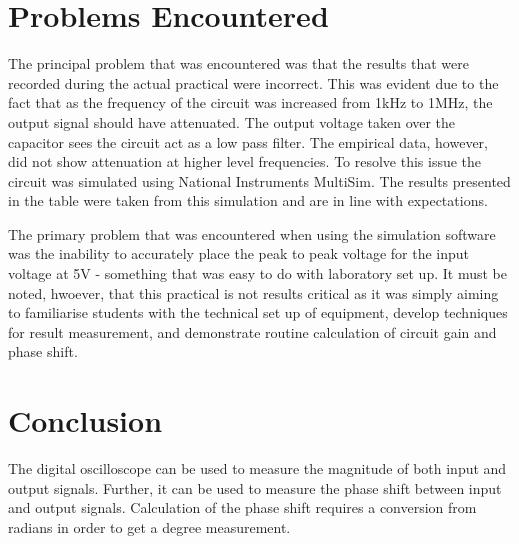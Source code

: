 \documentclass{article}
\begin{document}

\section{Problems Encountered}


The principal problem that was encountered was that the results that were recorded during the actual practical were incorrect. This was evident due to the fact that as the frequency of the circuit was increased from 1kHz to 1MHz, the output signal should have attenuated. The output voltage taken over the capacitor sees the circuit act as a low pass filter. The empirical data, however, did not show attenuation at higher level frequencies. To resolve this issue the circuit was simulated using National Instruments MultiSim. The results presented in the table were taken from this simulation and are in line with expectations.

The primary problem that was encountered when using the simulation software was the inability to accurately place the peak to peak voltage for the input voltage at 5V - something that was easy to do with laboratory set up. It must be noted, hwoever, that this practical is not results critical as it was simply aiming to familiarise students with the technical set up of equipment, develop techniques for result measurement, and demonstrate routine calculation of circuit gain and phase shift.


\section{Conclusion}
The digital oscilloscope can be used to measure the magnitude of both input and output signals. Further, it can be used to measure the phase shift between input and output signals. Calculation of the phase shift requires a conversion from radians in order to get a degree measurement.
\end{document}
